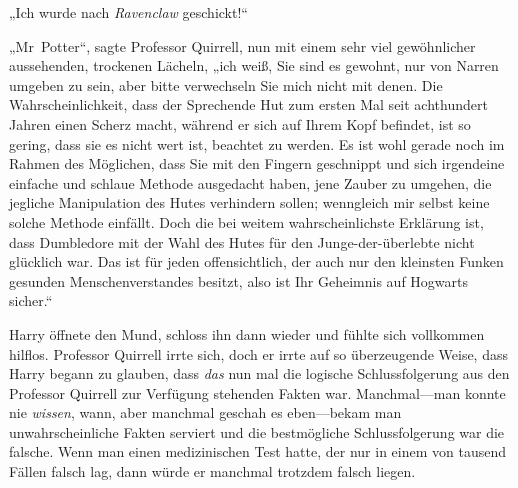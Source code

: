 „Ich wurde nach \emph{Ravenclaw} geschickt!“

„Mr~Potter“, sagte Professor Quirrell, nun mit einem sehr viel gewöhnlicher aussehenden, trockenen Lächeln, „ich weiß, Sie sind es gewohnt, nur von Narren umgeben zu sein, aber bitte verwechseln Sie mich nicht mit denen. Die Wahrscheinlichkeit, dass der Sprechende Hut zum ersten Mal seit achthundert Jahren einen Scherz macht, während er sich auf Ihrem Kopf befindet, ist so gering, dass sie es nicht wert ist, beachtet zu werden. Es ist wohl gerade noch im Rahmen des Möglichen, dass Sie mit den Fingern geschnippt und sich irgendeine einfache und schlaue Methode ausgedacht haben, jene Zauber zu umgehen, die jegliche Manipulation des Hutes verhindern sollen; wenngleich mir selbst keine solche Methode einfällt. Doch die bei weitem wahrscheinlichste Erklärung ist, dass Dumbledore mit der Wahl des Hutes für den Junge-der-überlebte nicht glücklich war. Das ist für jeden offensichtlich, der auch nur den kleinsten Funken gesunden Menschenverstandes besitzt, also ist Ihr Geheimnis auf Hogwarts sicher.“

Harry öffnete den Mund, schloss ihn dann wieder und fühlte sich vollkommen hilflos. Professor Quirrell irrte sich, doch er irrte auf so überzeugende Weise, dass Harry begann zu glauben, dass \emph{das} nun mal die logische Schlussfolgerung aus den Professor Quirrell zur Verfügung stehenden Fakten war. Manchmal—man konnte nie \emph{wissen}, wann, aber manchmal geschah es eben—bekam man unwahrscheinliche Fakten serviert und die bestmögliche Schlussfolgerung war die falsche. Wenn man einen medizinischen Test hatte, der nur in einem von tausend Fällen falsch lag, dann würde er manchmal trotzdem falsch liegen.

